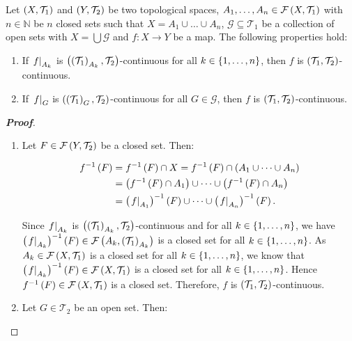 \begin{theorem}
  Let $\left(X,\mathcal{T}_1\right)$ and $\left(Y,\mathcal{T}_2\right)$ be two topological spaces, $A_1,\dots,A_n\in\mathcal{F}\left(X,\mathcal{T}_1\right)$ with $n\in\mathbb{N}$ be $n$ closed sets such that $X=A_1\cup\dots\cup A_n$, $\mathcal{G}\subseteq\mathcal{T}_1$ be a collection of open sets with $X=\bigcup{\mathcal{G}}$ and $f:X\rightarrow Y$ be a map. The following properties hold:

  \begin{enumerate}
    \item If $\left.f\right|_{A_k}$ is $\left(\left(\mathcal{T}_1\right)_{A_k},\mathcal{T}_2\right)$-continuous for all $k\in\left\{1,\dots,n\right\}$, then $f$ is $\left(\mathcal{T}_1,\mathcal{T}_2\right)$-continuous.
    \item If $\left.f\right|_{G}$ is $\left(\left(\mathcal{T}_1\right)_G,\mathcal{T}_2\right)$-continuous for all $G\in\mathcal{G}$, then $f$ is $\left(\mathcal{T}_1,\mathcal{T}_2\right)$-continuous.
  \end{enumerate}
  \begin{proof}[\rm\textbf{Proof}]
    \hfill
    \begin{enumerate}
      \item Let $F\in\mathcal{F}\left(Y,\mathcal{T}_2\right)$ be a closed set. Then:
      
      \begin{equation}
        \begin{split}
          f^{-1}\left(F\right) & =f^{-1}\left(F\right)\cap X=f^{-1}\left(F\right)\cap\left(A_1\cup\dots\cup A_n\right)\\
          & =\left(f^{-1}\left(F\right)\cap A_1\right)\cup\dots\cup\left(f^{-1}\left(F\right)\cap A_n\right)\\
          & =\left(\left.f\right|_{A_1}\right)^{-1}\left(F\right)\cup\dots\cup\left(\left.f\right|_{A_n}\right)^{-1}\left(F\right).
        \end{split}
      \end{equation}

      Since $\left.f\right|_{A_k}$ is $\left(\left(\mathcal{T}_1\right)_{A_k},\mathcal{T}_2\right)$-continuous and for all $k\in\left\{1,\dots,n\right\}$, we have $\left(\left.f\right|_{A_k}\right)^{-1}\left(F\right)\in\mathcal{F}\left(A_k,\left(\mathcal{T}_1\right)_{A_k}\right)$ is a closed set for all $k\in\left\{1,\dots,n\right\}$. As $A_k\in\mathcal{F}\left(X,\mathcal{T}_1\right)$ is a closed set for all $k\in\left\{1,\dots, n\right\}$, we know that $\left(\left.f\right|_{A_k}\right)^{-1}\left(F\right)\in\mathcal{F}\left(X,\mathcal{T}_1\right)$ is a closed set for all $k\in\left\{1,\dots, n\right\}$. Hence $f^{-1}\left(F\right)\in\mathcal{F}\left(X,\mathcal{T}_1\right)$ is a closed set. Therefore, $f$ is $\left(\mathcal{T}_1,\mathcal{T}_2\right)$-continuous.
      \item Let $G\in\mathcal{T}_2$ be an open set. Then:
      

\end{enumerate}
\end{proof}
\end{theorem}
